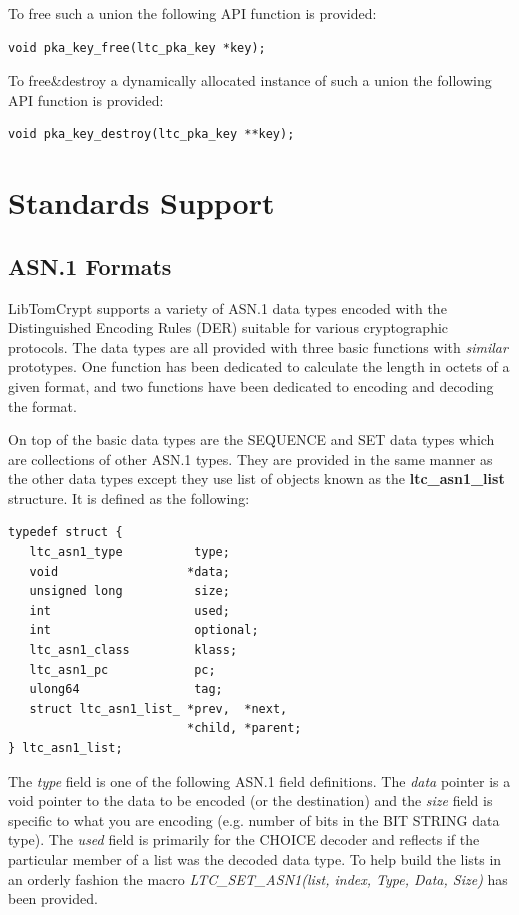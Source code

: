 \documentclass[synpaper]{book}
\newcommand{\mysection}[1]    %
	{                   %
	\section{#1}
   \markboth{\textsf{www.libtom.net}}{\thesection ~ {#1}}
	}
\begin{document}
To free such a union the following API function is provided:

\begin{verbatim}
void pka_key_free(ltc_pka_key *key);
\end{verbatim}

To free\&destroy a dynamically allocated instance of such a union the following API function is provided:

\begin{verbatim}
void pka_key_destroy(ltc_pka_key **key);
\end{verbatim}

\chapter{Standards Support}
\mysection{ASN.1 Formats}
LibTomCrypt supports a variety of ASN.1 data types encoded with the Distinguished Encoding Rules (DER) suitable for various cryptographic protocols.  The data types
are all provided with three basic functions with \textit{similar} prototypes.  One function has been dedicated to calculate the length in octets of a given
format, and two functions have been dedicated to encoding and decoding the format.

On top of the basic data types are the SEQUENCE and SET data types which are collections of other ASN.1 types.  They are provided
in the same manner as the other data types except they use list of objects known as the \textbf{ltc\_asn1\_list} structure.  It is defined as the following:

\begin{verbatim}
typedef struct {
   ltc_asn1_type          type;
   void                  *data;
   unsigned long          size;
   int                    used;
   int                    optional;
   ltc_asn1_class         klass;
   ltc_asn1_pc            pc;
   ulong64                tag;
   struct ltc_asn1_list_ *prev,  *next,
                         *child, *parent;
} ltc_asn1_list;
\end{verbatim}

The \textit{type} field is one of the following ASN.1 field definitions.  The \textit{data} pointer is a void pointer to the data to be encoded (or the destination) and the
\textit{size} field is specific to what you are encoding (e.g. number of bits in the BIT STRING data type).  The \textit{used} field is primarily for the CHOICE decoder
and reflects if the particular member of a list was the decoded data type.  To help build the lists in an orderly fashion the macro
\textit{LTC\_SET\_ASN1(list, index, Type, Data, Size)} has been provided.
\end{document}
